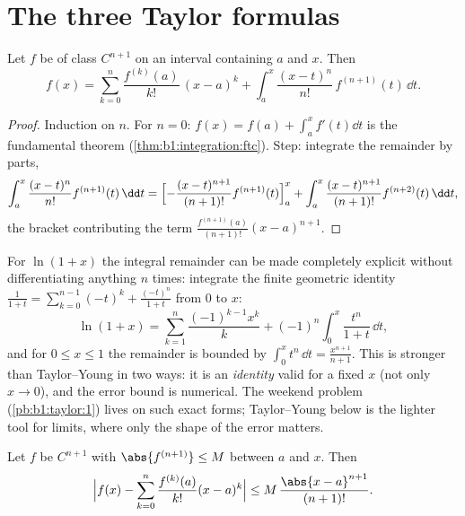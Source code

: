 \section{The three Taylor formulas}

\begin{theorem}\label{thm:b1:taylor:integral}
Let $f$ be of class $C^{n+1}$ on an interval containing $a$ and $x$.
Then
\[
f(x) = \sum_{k=0}^{n} \frac{f^{(k)}(a)}{k!}\,(x - a)^k
+ \int_a^x \frac{(x - t)^n}{n!}\, f^{(n+1)}(t)\, \dd t .
\]
\end{theorem}

\begin{proof}
Induction on $n$. For $n = 0$: $f(x) = f(a) + \int_a^x f'(t)\dd t$ is
the fundamental theorem (\cref{thm:b1:integration:ftc}). Step:
integrate the remainder by parts,
\[
\int_a^x \frac{(x-t)^n}{n!} f^{(n+1)}(t)\,\dd t
= \Bigl[-\frac{(x-t)^{n+1}}{(n+1)!} f^{(n+1)}(t)\Bigr]_a^x
+ \int_a^x \frac{(x-t)^{n+1}}{(n+1)!} f^{(n+2)}(t)\,\dd t ,
\]
the bracket contributing the term $\frac{f^{(n+1)}(a)}{(n+1)!}(x -
a)^{n+1}$.
\end{proof}

\begin{example}\label{ex:b1:taylor:lnexact}
For $\ln(1 + x)$ the integral remainder can be made completely
explicit without differentiating anything $n$ times: integrate
the finite geometric identity $\frac{1}{1+t} =
\sum_{k=0}^{n-1}(-t)^k + \frac{(-t)^n}{1+t}$ from $0$ to $x$:
\[
\ln(1 + x) = \sum_{k=1}^{n} \frac{(-1)^{k-1}x^k}{k}
+ (-1)^n \int_0^x \frac{t^n}{1 + t}\,\dd t ,
\]
and for $0 \leq x \leq 1$ the remainder is bounded by $\int_0^x
t^n\,\dd t = \frac{x^{n+1}}{n+1}$. This is stronger than
Taylor--Young in two ways: it is an \emph{identity} valid for a
fixed $x$ (not only $x \to 0$), and the error bound is numerical.
The weekend problem (\cref{pb:b1:taylor:1}) lives on such exact
forms; Taylor--Young below is the lighter tool for limits, where
only the shape of the error matters.
\end{example}

\begin{theorem}\label{thm:b1:taylor:lagrange}
Let $f$ be $C^{n+1}$ with $\abs{f^{(n+1)}} \leq M$ between $a$ and
$x$. Then
\[
\Bigl| f(x) - \sum_{k=0}^{n} \frac{f^{(k)}(a)}{k!}(x-a)^k \Bigr|
\leq M\, \frac{\abs{x - a}^{n+1}}{(n+1)!} .
\]
\end{theorem}

